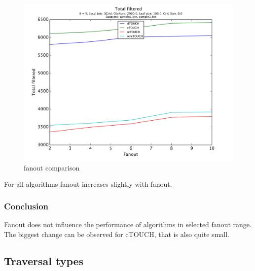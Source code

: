 \documentclass{sig-alternate}
\begin{document}
\begin{figure}[htb]
    \begin{center}
        \includegraphics[width=\columnwidth]{fanout/totalfiltered}
        \caption{fanout comparison}
        \label{fig:fanout:filter}
      \end{center}
\end{figure}

For all algorithms fanout increases slightly with fanout.

\subsubsection{Conclusion}
Fanout does not influence the performance of algorithms in selected fanout range. The biggest change can be observed for cTOUCH, that is also quite small.

\subsection{Traversal types}
\end{document}
